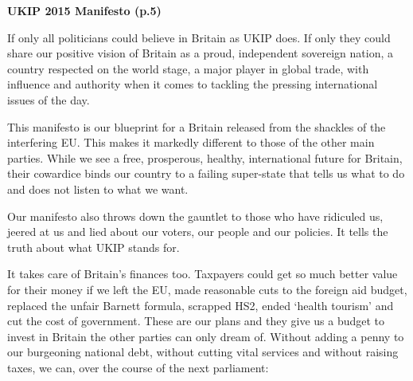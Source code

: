 \documentclass[11pt, a4paper]{article}
\begin{document}
\thispagestyle{empty}

\begin{center}
\textbf{UKIP 2015 Manifesto (p.5)}
\end{center}


If only all politicians could believe in Britain as UKIP does. If only they could share our positive vision of Britain as a proud, independent sovereign nation, a country respected on the world stage, a major player in global trade, with influence and authority when it comes to tackling the pressing international issues of the day.

This manifesto is our blueprint for a Britain released from the shackles of the interfering EU. This makes it markedly different to those of the other main parties. While we see a free, prosperous, healthy, international future for Britain, their cowardice binds our country to a failing super-state that tells us what to do and does not listen to what we want.

Our manifesto also throws down the gauntlet to those who have ridiculed us, jeered at us and lied about our voters, our people and our policies. It tells the truth about what UKIP stands for.

It takes care of Britain’s finances too. Taxpayers could get so much better value for their money if we left the EU, made reasonable cuts to the foreign aid budget, replaced the unfair Barnett formula, scrapped HS2, ended `health tourism' and cut the cost of government. These are our plans and they give us a budget to invest in Britain the other parties can only dream of. Without adding a penny to our burgeoning national debt, without cutting vital services and without raising taxes, we can, over the course of the next parliament:
\end{document}
